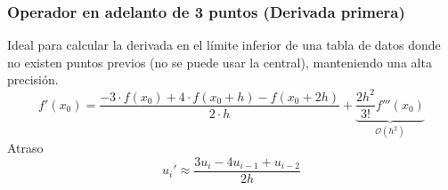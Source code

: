 \subsubsection{Operador en adelanto de 3 puntos (Derivada primera)}
Ideal para calcular la derivada en el límite inferior de una tabla de datos donde no existen puntos previos (no se puede usar la central), manteniendo una alta precisión.
\begin{equation}
    f'(x_0) = \frac{-3 \cdot f(x_0) + 4 \cdot f(x_0+h) - f(x_0+2h)}{2 \cdot h} + \underbrace{\frac{2h^2}{3!} f'''(x_0)}_{\mathcal{O}(h^2)}
\end{equation}
Atraso
$$u_i' \approx \frac{3u_i - 4u_{i-1} + u_{i-2}}{2h}$$